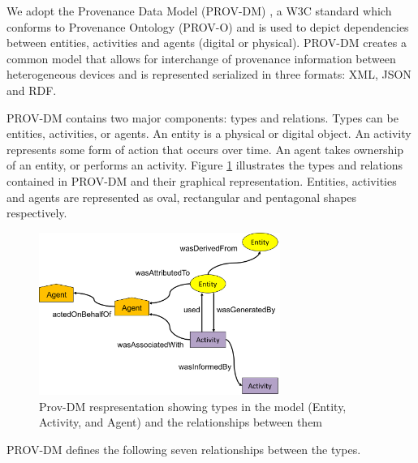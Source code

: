 We adopt the Provenance Data Model (PROV-DM) \cite{prov_dm}, a W3C standard which conforms to Provenance Ontology (PROV-O) and is used to depict dependencies between entities, activities and agents (digital or physical). PROV-DM creates a common model that allows for interchange of provenance information between heterogeneous devices and is represented serialized in three formats:  XML, JSON and RDF. 

\par PROV-DM contains two major components: types and relations.  Types can be entities, activities, or agents. An entity is a physical or digital object. An activity represents some form of action that occurs over time.  An agent takes ownership of an entity, or performs an activity. Figure \ref{prov_rep} illustrates the types and relations contained in PROV-DM and their graphical representation. Entities, activities and agents are represented as oval, rectangular and pentagonal shapes respectively. 


\begin{figure}[h!]
\begin{center}

\includegraphics[width=0.7\textwidth]{prov_dm_2.PNG}
\end{center}
\caption{Prov-DM respresentation showing types in the model (Entity, Activity, and Agent) and the relationships between them }
\label{prov_rep}
\end{figure}


\par PROV-DM defines the following seven relationships between the types. 

